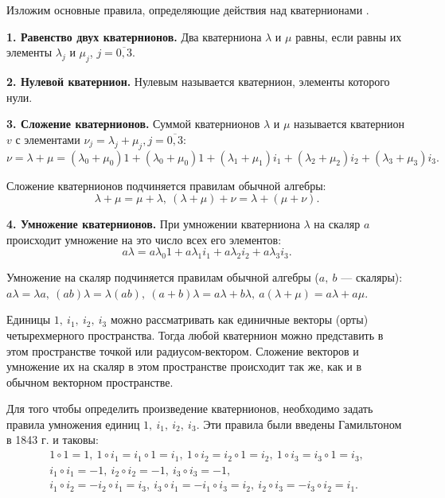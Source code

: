 \documentclass[14pt]{extreport}
\begin{document}
Изложим основ­ные правила, определяющие действия над кватернионами \cite{branets}.

\textbf{1. Равенство двух кватернионов.} Два кватерниона $\lambda$ и $\mu$ равны, если равны их элементы $\lambda_{j}$ и $\mu_{j}$, $j = \overline{0,3}$.

\textbf{2. Нулевой кватернион.} Нулевым называется кватернион, элементы которого нули.

\textbf{3. Сложение кватернионов.} Суммой кватернионов $\lambda$ и $\mu$ называется кватернион $v$ с элементами $\nu_{j} = \lambda_{j} + \mu_{j}, j = \overline{0,3}$:
\begin{equation}
\label{sum-quat}
\nu = \lambda + \mu = (\lambda_{0} + \mu_{0}) 1 + (\lambda_{0} + \mu_{0}) 1 + (\lambda_{1} + \mu_{1}) i_{1} + (\lambda_{2} + \mu_{2}) i_{2} + (\lambda_{3} + \mu_{3}) i_{3}.
\end{equation}

Сложение кватернионов подчиняется правилам обычной алгебры:
\begin{equation}
\label{sum-quat-algebra}
\lambda + \mu = \mu + \lambda,\ (\lambda + \mu)+\nu = \lambda + (\mu+\nu).
\end{equation}

\textbf{4. Умножение кватернионов.} При умножении кватерниона $\lambda$ на скаляр $a$ происходит умножение на это число всех его элементов:
\begin{equation}
\label{scal-mul-quat}
a\lambda=a\lambda_{0}1+a\lambda_{1}i_{1}+a\lambda_{2}i_{2}+a\lambda_{3}i_{3}.
\end{equation}

Умножение на скаляр подчиняется правилам обычной алгебры ($a,\ b$ — скаляры): $a\lambda = \lambda a,\ (ab)\lambda = \lambda(ab),\ (a + b)\lambda = a\lambda + b\lambda,\ a(\lambda + \mu) = a\lambda + a\mu.$

Единицы $1,\ i_{1},\ i_{2},\ i_{3}$ можно рассматривать как единичные векторы (орты) четырехмерного пространства. Тогда любой кватернион можно представить в этом пространстве точкой или радиусом-вектором. Сложение векторов и умножение их на скаляр в этом пространстве происходит так же, как и в обычном векторном пространстве.

Для того чтобы определить произведение кватернионов, необходимо задать правила умножения единиц $1,\ i_{1},\ i_{2},\ i_{3}$. Эти правила были введены Гамильтоном в 1843 г. и таковы:
\begin{equation}
\label{H-rules}
\begin{split}
1\circ 1 = 1,\ 1\circ i_{1} = i_{1} \circ 1 = i_{1},\ 1\circ i_{2} = i_{2} \circ 1 = i_{2},\ 1\circ i_{3} = i_{3} \circ 1 = i_{3},\\
i_{1}\circ i_{1} = -1,\ i_{2}\circ i_{2} = -1,\ i_{3}\circ i_{3} = -1,\\
i_{1}\circ i_{2} = -i_{2}\circ i_{1} = i_{3},\ i_{3}\circ i_{1} = -i_{1}\circ i_{3} = i_{2},\ i_{2}\circ i_{3} = -i_{3}\circ i_{2} = i_{1}.
\end{split}
\end{equation}
\end{document}
